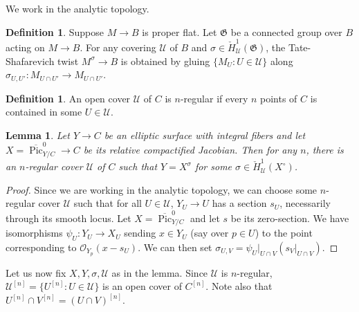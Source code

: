 \documentclass{amsart}
\theoremstyle{plain}
\newtheorem{lemma}[theorem]{Lemma}
\theoremstyle{definition}
\newtheorem{definition}[theorem]{Definition}
\theoremstyle{remark}
\begin{document}
    We work in the analytic topology.
    \begin{definition}
        Suppose $M\to B$ is proper flat.
        Let $\mathfrak G$ be a connected group over $B$ acting on $M\to B$.
        For any covering $\mathcal U$ of $B$ and $\sigma\in\check{H}^1_{\mathcal U}(\mathfrak G)$, the Tate-Shafarevich twist $M^\sigma\to B$ is obtained by gluing $\{M_U:U\in\mathcal U\}$ along $\sigma_{U,U'}:M_{U\cap U'}\to M_{U\cap U'}$.
    \end{definition}
    \begin{definition}
        An open cover $\mathcal U$ of $C$ is $n$-regular if every $n$ points of $C$ is contained in some $U\in\mathcal U$.
    \end{definition}
    \begin{lemma}
        Let $Y\to C$ be an elliptic surface with integral fibers and let $X=\overline{\operatorname{Pic}}_{Y/C}^0\to C$ be its relative compactified Jacobian.
        Then for any $n$, there is an $n$-regular cover $\mathcal U$ of $C$ such that $Y=X^\sigma$ for some $\sigma\in\check H^1_{\mathcal U}(X^\circ)$.
    \end{lemma}
    \begin{proof}
        Since we are working in the analytic topology, we can choose some $n$-regular cover $\mathcal U$ such that for all $U\in\mathcal U$, $Y_U\to U$ has a section $s_U$, necessarily through its smooth locus.
        Let $X=\overline{\operatorname{Pic}}_{Y/C}^0$ and let $s$ be its zero-section.
        We have isomorphisms $\psi_U:Y_U\to X_U$ sending $x\in Y_U$ (say over $p\in U$) to the point corresponding to $\mathcal O_{Y_p}(x-s_U)$.
        We can then set $\sigma_{U,V}=\psi_U|_{U\cap V}(s_V|_{U\cap V})$.
    \end{proof}
    Let us now fix $X,Y,\sigma,\mathcal U$ as in the lemma.
    Since $\mathcal U$ is $n$-regular, $\mathcal U^{[n]}=\{U^{[n]}:U\in\mathcal U\}$ is an open cover of $C^{[n]}$.
    Note also that $U^{[n]}\cap V^{[n]}=(U\cap V)^{[n]}$.
\end{document}
